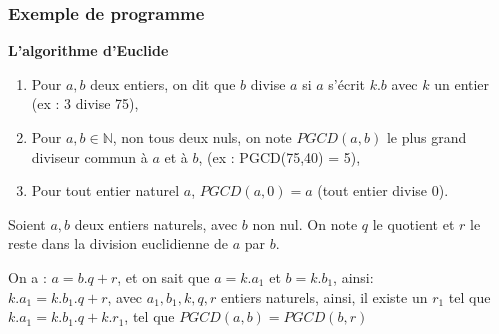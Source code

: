 %
%
%
%
%
%
%		
%
%

\begin{frame}[fragile]
\frametitle{Exemple de programme}

\textbf{L'algorithme d'Euclide}

\begin{savoir}
\begin{enumerate}
 \item Pour $a,b$ deux entiers, on dit que $b$ divise $a$ si $a$ s'écrit $k.b$ avec $k$ un entier (ex : 3 divise 75),
 \item Pour $a,b\in \mathbb{N}$, non tous deux nuls, on note $PGCD(a,b)$ le plus grand diviseur commun à $a$ et à $b$,
(ex : PGCD(75,40) = 5),
 \item Pour tout entier naturel $a$, $PGCD(a,0) = a$ (tout entier divise $0$).
\end{enumerate}
\end{savoir}

Soient $a,b$ deux entiers naturels, avec $b$ non nul. On note $q$ le quotient et $r$ le reste dans la division euclidienne de $a$ par $b$.

On a : $a=b.q+r$, et on sait que $a=k.a_1$ et $b=k.b_1$, ainsi: \\
$k.a_1=k.b_1.q+r$, avec $a_1,b_1,k,q,r$ entiers naturels, ainsi, il existe un $r_1$ tel que $k.a_1=k.b_1.q+k.r_1$, tel que
$PGCD(a,b) = PGCD(b,r)$

\end{frame}

